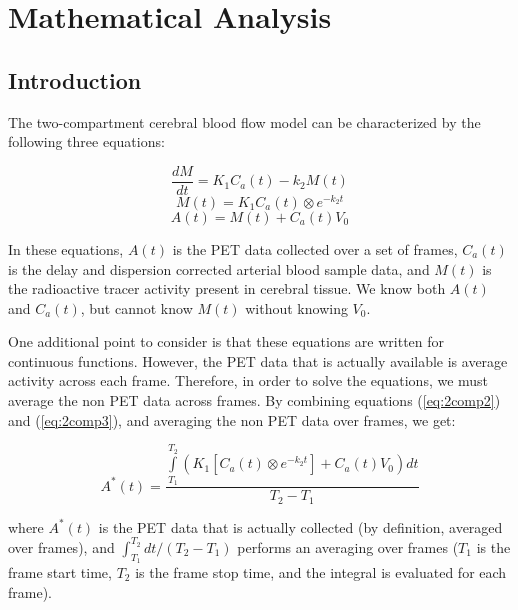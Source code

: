 \section{Mathematical Analysis}

\subsection{Introduction}

The two-compartment cerebral blood flow model can be characterized by
the following three equations:

\begin{equation}
\frac{dM}{dt} = K_{1}C_{a}(t) - k_{2}M(t)      \label{eq:2comp1}
\end{equation}
\begin{equation}
M(t) = K_{1}C_{a}(t) \otimes e^{-k_{2}t}       \label{eq:2comp2}
\end{equation}
\begin{equation}
A(t) = M(t) + C_{a}(t)V_{0}                    \label{eq:2comp3}
\end{equation}

In these equations, $A(t)$ is the PET data collected over a set of
frames, $C_{a}(t)$ is the delay and dispersion corrected arterial
blood sample data, and $M(t)$ is the radioactive tracer activity
present in cerebral tissue.  We know both $A(t)$ and $C_{a}(t)$, but
cannot know $M(t)$ without knowing $V_{0}$.

One additional point to consider is that these equations are written
for continuous functions.  However, the PET data that is actually
available is average activity across each frame.  Therefore, in
order to solve the equations, we must average the non PET data
across frames.  By combining equations (\ref{eq:2comp2}) and
(\ref{eq:2comp3}), and averaging the non PET data over frames, we
get:

\begin{equation}
A^{*}(t) = \frac{\int\limits_{T_1}^{T_2} \left( K_{1} \left[ C_{a}(t) \otimes
  e^{-k_{2}t} \right] + C_{a}(t)V_{0} \right) dt}{T_{2} - T_{1}}
\label{eq:2comp4}
\end{equation}

where $A^{*}(t)$ is the PET data that is actually collected (by
definition, averaged over frames), and ${\int_{T_1}^{T_2}dt} / {(T_2 -
T_1)}$ performs an averaging over frames ($T_1$ is the frame start
time, $T_2$ is the frame stop time, and the integral is evaluated for
each frame).

